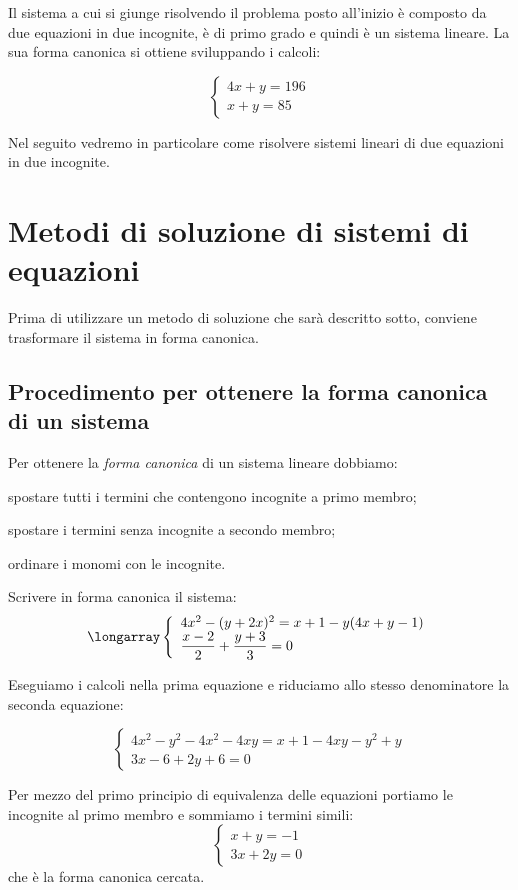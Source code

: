 Il sistema a cui si giunge risolvendo il problema posto all'inizio è
composto da due equazioni in due incognite, è di primo grado 
e quindi è un sistema lineare. 
La sua forma canonica si ottiene sviluppando i calcoli:

\[\left\{\begin{array}{l}
4x+y=196\\
x+y=85
\end{array}\right.\]

Nel seguito vedremo in particolare come risolvere sistemi lineari 
di due equazioni in due incognite.

\section{Metodi di soluzione di sistemi di equazioni}
\label{sec:sist_soluzione}

Prima di utilizzare un metodo di soluzione che sarà descritto sotto, 
conviene trasformare il sistema in forma canonica.

\subsection{Procedimento per ottenere la forma canonica di un sistema}
Per ottenere la \emph{forma canonica} di un sistema lineare dobbiamo:
\begin{enumerate*}
 \item spostare tutti i termini che contengono incognite a primo membro;
 \item spostare i termini senza incognite a secondo membro;
 \item ordinare i monomi con le incognite.
\end{enumerate*}


\begin{exrig}
 \begin{esempio}
 Scrivere in forma canonica il sistema:
\[\longarray\left\{\begin{array}{l}4x^{2}-(y+2x)^{2}=x+1-y(4x+y-1)\\
\dfrac{x-2}{2}+\dfrac{y+3}{3}=0
\end{array}\right.\]

Eseguiamo i calcoli nella prima equazione e riduciamo allo stesso
denominatore la seconda equazione:

\[\left\{\begin{array}{l}
 4x^{2}-y^{2}-4x^{2}-4xy=x+1-4xy-y^{2}+y\\
 3x-6+2y+6=0
 \end{array}\right.\]

Per mezzo del primo principio di equivalenza delle equazioni portiamo le
incognite al primo membro e sommiamo i termini simili:
 \[\left\{\begin{array}{l}
   x+y=-1\\
   3x+2y=0
\end{array}\right.\]
che è la forma canonica cercata.
 \end{esempio}
\end{exrig}

